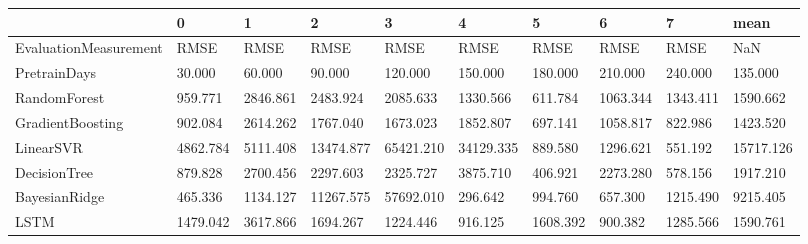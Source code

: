\begin{tabular}{llllllllll}
\toprule
{} &        0 &        1 &         2 &         3 &         4 &        5 &        6 &        7 &      mean \\
\midrule
EvaluationMeasurement &     RMSE &     RMSE &      RMSE &      RMSE &      RMSE &     RMSE &     RMSE &     RMSE &       NaN \\
PretrainDays          &   30.000 &   60.000 &    90.000 &   120.000 &   150.000 &  180.000 &  210.000 &  240.000 &   135.000 \\
RandomForest          &  959.771 & 2846.861 &  2483.924 &  2085.633 &  1330.566 &  611.784 & 1063.344 & 1343.411 &  1590.662 \\
GradientBoosting      &  902.084 & 2614.262 &  1767.040 &  1673.023 &  1852.807 &  697.141 & 1058.817 &  822.986 &  1423.520 \\
LinearSVR             & 4862.784 & 5111.408 & 13474.877 & 65421.210 & 34129.335 &  889.580 & 1296.621 &  551.192 & 15717.126 \\
DecisionTree          &  879.828 & 2700.456 &  2297.603 &  2325.727 &  3875.710 &  406.921 & 2273.280 &  578.156 &  1917.210 \\
BayesianRidge         &  465.336 & 1134.127 & 11267.575 & 57692.010 &   296.642 &  994.760 &  657.300 & 1215.490 &  9215.405 \\
LSTM                  & 1479.042 & 3617.866 &  1694.267 &  1224.446 &   916.125 & 1608.392 &  900.382 & 1285.566 &  1590.761 \\
\bottomrule
\end{tabular}
